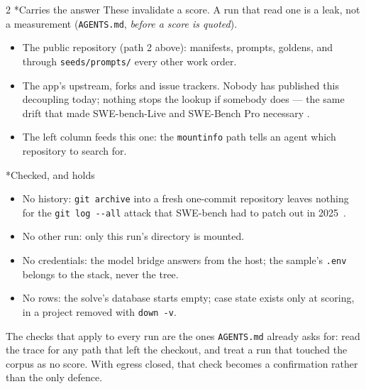 \documentclass[10pt,a4paper]{article}
\makeatletter
\renewcommand\subsection{\@startsection{subsection}{2}{0pt}{8pt}{2pt}%
  {\display\bfseries\normalsize\color{ink}}}
\makeatother
\begin{document}
\begin{multicols}{2}
\subsection*{Carries the answer}
These invalidate a score. A run that read one is a leak, not a
measurement (\texttt{AGENTS.md}, \emph{before a score is quoted}).
\begin{itemize}
\item The public repository (path 2 above): manifests, prompts,
  goldens, and through \texttt{seeds/prompts/} every other work order.
\item The app's upstream, forks and issue trackers. Nobody has published
  this decoupling today; nothing stops the lookup if somebody does — the
  same drift that made SWE-bench-Live and SWE-Bench Pro necessary
  \cite{swebenchlive, sweprover}.
\item The left column feeds this one: the \texttt{mountinfo} path tells
  an agent which repository to search for.
\end{itemize}

\subsection*{Checked, and holds}
\begin{itemize}
\item No history: \texttt{git archive} into a fresh one-commit repository
  leaves nothing for the \texttt{git log -{}-all} attack that SWE-bench
  had to patch out in 2025~\cite{swebench465}.
\item No other run: only this run's directory is mounted.
\item No credentials: the model bridge answers from the host; the sample's
  \texttt{.env} belongs to the stack, never the tree.
\item No rows: the solve's database starts empty; case state exists only
  at scoring, in a project removed with \texttt{down -v}.
\end{itemize}
The checks that apply to every run are the ones \texttt{AGENTS.md}
already asks for: read the trace for any path that left the checkout,
and treat a run that touched the corpus as no score. With egress closed,
that check becomes a confirmation rather than the only defence.
\end{multicols}


\clearpage
\end{document}
